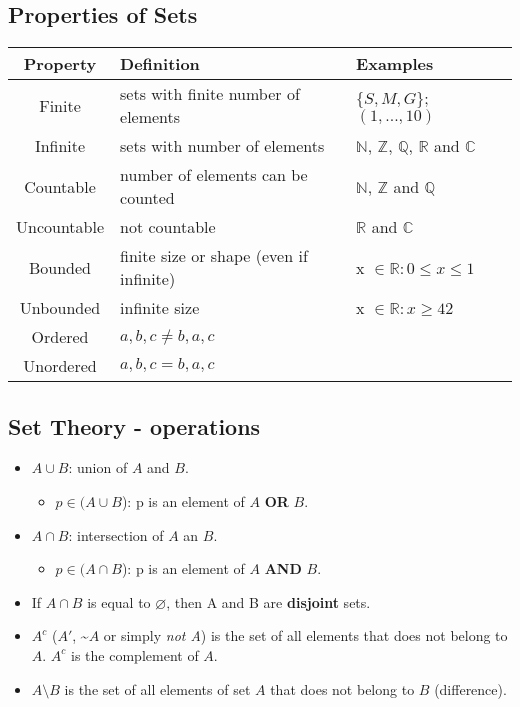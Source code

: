 \documentclass[11pt]{article}
\let\emptyset\varnothing
\begin{document}
\subsection*{Properties of Sets}

\begin{tabular}{cll}
	Property & Definition & Examples \\
	\hline
	Finite & sets with finite number of elements & $\{S, M, G\}$; $(1, ..., 10)$\\ 
	Infinite & sets with  number of elements & $\mathbb{N}$, $\mathbb{Z}$, $\mathbb{Q}$, $\mathbb{R}$ and $\mathbb{C}$\\
	Countable & number of elements can be counted & $\mathbb{N}$, $\mathbb{Z}$ and $\mathbb{Q}$\\
	Uncountable & not countable & $\mathbb{R}$ and $\mathbb{C}$ \\
	Bounded & finite size or shape (even if infinite)  & x $\in \mathbb{R}: 0 \leq x \leq 1$\\
	Unbounded & infinite size & x $\in \mathbb{R}: x \geq 42$\\
	Ordered & ${a, b, c} \neq {b, a, c}$  & \\
	Unordered & ${a, b, c} = {b, a, c}$  & \\
\end{tabular}


\subsection*{Set Theory - operations}

	\begin{itemize}
		\item $A \cup B$: union of $A$ and $B$.
		\begin{itemize}
			\item $p \in (A \cup B$): p is an element of $A$ \textbf{OR} $B$.
		\end{itemize}
		\item $A \cap B$: intersection of $A$ an $B$.
		\begin{itemize}
			\item $p \in (A \cap B$): p is an element of $A$ \textbf{AND} $B$.
		\end{itemize}
		\item If $A \cap B$ is equal to $\emptyset$, then A and B are \textbf{disjoint} sets.
		\item $A^c$ ($A'$, \textasciitilde$A$ or simply \emph{not A}) is the set of all elements that does not belong to $A$. $A^c$ is the complement of $A$. 
		\item $A \setminus B$ is the set of all elements of set $A$ that does not belong to $B$ (difference). 

	\end{itemize}
\end{document}
